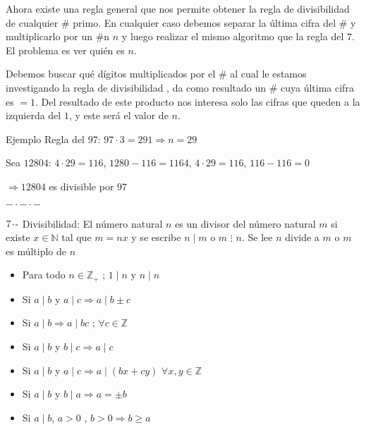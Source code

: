 Ahora existe una regla general que nos permite obtener la regla de divisibilidad de cualquier \# primo. En cualquier caso debemos separar la última cifra del \# y multiplicarlo por un \#n $n$ y luego realizar el mismo algoritmo que la regla del $7$. El problema es ver quién es $n$.

Debemos buscar qué dígitos multiplicados por el \# al cual le estamos investigando la regla de divisibilidad , da como resultado un \# cuya última cifra es $= 1$. Del resultado de este producto nos interesa solo las cifras que queden a la izquierda del $1$, y este será el valor de $n$.

Ejemplo Regla del $97$: $97\cdot3=291 \Longrightarrow n=29$

\hspace{1cm}Sea $12804$: $4\cdot29=116$, $1280-116=1164$, $4\cdot29=116$, $116-116=0$

$\Longrightarrow 12804$ es divisible por $97$
\begin{center}
    \texttt{$-\cdot-\cdot-$}
\end{center}
$7\hspace{-0.05cm}\cdot\hspace{-0.05cm}\text{-}$ Divisibilidad: El número natural $n$ es un divisor del número natural $m$ si existe $x \in \mathbb{N}$ tal que $m = nx$ y se escribe $n \mid m$ o $m$ $\vdots$ $n$. Se lee $n$ divide a $m$ o $m$ es múltiplo de $n$
\begin{itemize}
    \def\labelitemi{-}
    \addtolength{\itemindent}{1cm}
    \item Para todo $n \in \mathbb{Z}_+$ ; $1 \mid n$ y $n \mid n$
    \item Si $a \mid b$ y $a \mid c \Longrightarrow a \mid b \pm c$
    \item Si $a \mid b \Longrightarrow a \mid bc$ ; $\forall c \in \mathbb{Z}$
    \item Si $a \mid b$ y $b \mid c \Longrightarrow a \mid c$
    \item Si $a \mid b$ y $a \mid c \Longrightarrow a \mid (bx + cy)$ $\forall x,y \in \mathbb{Z}$ 
    \item Si $a \mid b$ y $b \mid a \Longrightarrow a = \pm b$ 
    \item Si $a \mid b$, $a > 0$ , $b > 0 \Longrightarrow b \ge a$
\end{itemize}

\vspace{0.5cm}
